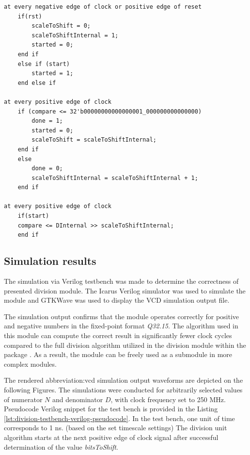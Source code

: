 \documentclass[a4paper, twoside, 11pt]{article}
\begin{document}

\begin{lstlisting}[language={pseudocode}, caption={Pseudocode for the denominatorSizeScaleUnit module algorithm.}, label= {lst:denominatorSizeScaleUnit-pseudocode}]
at every negative edge of clock or positive edge of reset
    if(rst)
        scaleToShift = 0;
        scaleToShiftInternal = 1;
        started = 0;
    end if
    else if (start)
        started = 1;
    end else if

at every positive edge of clock
    if (compare <= 32'b00000000000000001_000000000000000)
        done = 1;
        started = 0;
        scaleToShift = scaleToShiftInternal;
    end if
    else
        done = 0;
        scaleToShiftInternal = scaleToShiftInternal + 1;
    end if

at every positive edge of clock
    if(start)
    compare <= DInternal >> scaleToShiftInternal;
    end if
\end{lstlisting}

\subsection{Simulation results}
The simulation via Verilog testbench was made to determine the correctness of presented division module. The Icarus Verilog simulator was used to simulate the module and GTKWave was used to display the VCD simulation output file.\par
The simulation output confirms that the module operates correctly for positive and negative numbers in the fixed-point format \textit{Q32.15}. The algorithm used in this module can compute the correct result in significantly fewer clock cycles compared to the full division algorithm utilized in the division module within the package \cite{burke-fixed-point-math-library}. As a result, the module can be freely used as a submodule in more complex modules.\par
The rendered \gls{abbreviation:vcd} simulation output waveforms are depicted on the following Figures. The simulations were conducted for arbitrarily selected values of numerator $N$ and denominator $D$, with clock frequency set to 250 MHz. Pseudocode Verilog snippet for the test bench is provided in the Listing \ref{lst:division-testbench-verilog-pseudocode}. In the test bench, one unit of time corresponds to 1 ns. (based on the set timescale settings) The division unit algorithm starts at the next positive edge of clock signal after successful determination of the value \textit{bitsToShift}.
\end{document}
